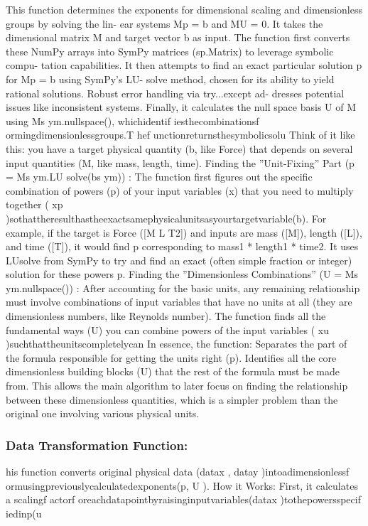 \documentclass{article}
\begin{document}
This function determines the exponents for dimensional scaling and dimensionless groups by solving the lin-
ear systems Mp = b and MU = 0. It takes the dimensional matrix M and target vector b as input. The
function first converts these NumPy arrays into SymPy matrices (sp.Matrix) to leverage symbolic compu-
tation capabilities. It then attempts to find an exact particular solution p for Mp = b using SymPy’s LU-
solve method, chosen for its ability to yield rational solutions. Robust error handling via try...except ad-
dresses potential issues like inconsistent systems. Finally, it calculates the null space basis U of M using
Ms ym.nullspace(), whichidentif iesthecombinationsf ormingdimensionlessgroups.T hef unctionreturnsthesymbolicsolu
Think of it like this: you have a target physical quantity (b, like Force) that depends on several input quantities
(M, like mass, length, time).
Finding the ”Unit-Fixing” Part (p = Ms ym.LU solve(bs ym)) :
The function first figures out the specific combination of powers (p) of your input variables (x) that you need to
multiply together ( xp )sothattheresulthastheexactsamephysicalunitsasyourtargetvariable(b).
For example, if the target is Force ([M L T2]) and inputs are mass ([M]), length ([L]), and time ([T]), it would
find p corresponding to mass1 * length1 * time2.
It uses LUsolve from SymPy to try and find an exact (often simple fraction or integer) solution for these powers
p.
Finding the ”Dimensionless Combinations” (U = Ms ym.nullspace()) :
After accounting for the basic units, any remaining relationship must involve combinations of input variables
that have no units at all (they are dimensionless numbers, like Reynolds number).
The function finds all the fundamental ways (U) you can combine powers of the input variables ( xu )suchthattheunitscompletelycan
In essence, the function:
Separates the part of the formula responsible for getting the units right (p).
Identifies all the core dimensionless building blocks (U) that the rest of the formula must be made from.
This allows the main algorithm to later focus on finding the relationship between these dimensionless quantities,
which is a simpler problem than the original one involving various physical units. 



\subsubsection{Data Transformation Function:}
his function converts original physical data (datax , datay )intoadimensionlessf ormusingpreviouslycalculatedexponents(p, U ).
How it Works: First, it calculates a scalingf actorf oreachdatapointbyraisinginputvariables(datax )tothepowersspecif iedinp(u\\
\end{document}
